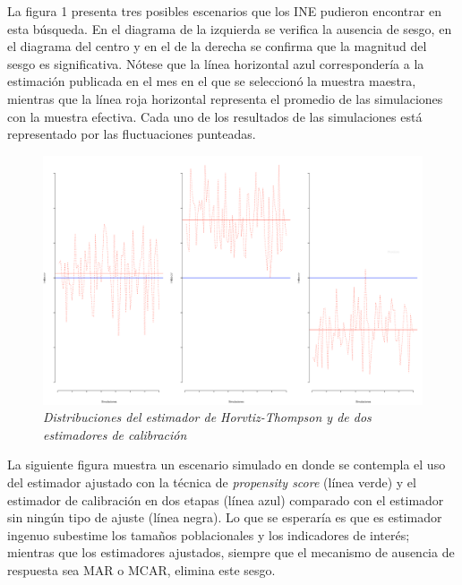 \documentclass[
  10pt,
  spanish,
]{book}
\begin{document}
La figura 1 presenta tres posibles escenarios que los INE pudieron encontrar en esta búsqueda. En el diagrama de la izquierda se verifica la ausencia de sesgo, en el diagrama del centro y en el de la derecha se confirma que la magnitud del sesgo es significativa. Nótese que la línea horizontal azul correspondería a la estimación publicada en el mes en el que se seleccionó la muestra maestra, mientras que la línea roja horizontal representa el promedio de las simulaciones con la muestra efectiva. Cada uno de los resultados de las simulaciones está representado por las fluctuaciones punteadas.

\begin{figure}
\centering
\includegraphics{Pics/calnr1.png}
\caption{\emph{Distribuciones del estimador de Horvtiz-Thompson y de dos estimadores de calibración}}
\end{figure}

La siguiente figura muestra un escenario simulado en donde se contempla el uso del estimador ajustado con la técnica de \emph{propensity score} (línea verde) y el estimador de calibración en dos etapas (línea azul) comparado con el estimador sin ningún tipo de ajuste (línea negra). Lo que se esperaría es que es estimador ingenuo subestime los tamaños poblacionales y los indicadores de interés; mientras que los estimadores ajustados, siempre que el mecanismo de ausencia de respuesta sea MAR o MCAR, elimina este sesgo.
\end{document}
